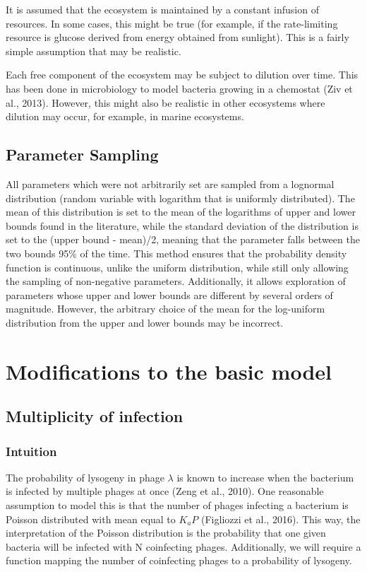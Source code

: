 \documentclass{article}
\begin{document}
It is assumed that the ecosystem is maintained by a constant infusion of resources. In some cases, this might be true (for example, if the rate-limiting resource is glucose derived from energy obtained from sunlight). This is a fairly simple assumption that may be realistic. 

Each free component of the ecosystem may be subject to dilution over time. This has been done in microbiology to model bacteria growing in a chemostat (Ziv et al., 2013). However, this might also be realistic in other ecosystems where dilution may occur, for example, in marine ecosystems. 

\subsection{Parameter Sampling}

All parameters which were not arbitrarily set are sampled from a lognormal distribution (random variable with logarithm that is uniformly distributed). The mean of this distribution is set to the mean of the logarithms of upper and lower bounds found in the literature, while the standard deviation of the distribution is set to the (upper bound - mean)/2, meaning that the parameter falls between the two bounds 95$\%$ of the time. This method ensures that the probability density function is continuous, unlike the uniform distribution, while still only allowing the sampling of non-negative parameters. Additionally, it allows exploration of parameters whose upper and lower bounds are different by several orders of magnitude. However, the arbitrary choice of the mean for the log-uniform distribution from the upper and lower bounds may be incorrect.

\section{Modifications to the basic model}
\subsection{Multiplicity of infection}
\subsubsection{Intuition}
The probability of lysogeny in phage $\lambda$ is known to increase when the bacterium is infected by multiple phages at once (Zeng et al., 2010). One reasonable assumption to model this is that the number of phages infecting a bacterium is Poisson distributed with mean equal to $K_aP$ (Figliozzi et al., 2016). This way, the interpretation of the Poisson distribution is the probability that one given bacteria will be infected with N coinfecting phages. Additionally, we will require a function mapping the number of coinfecting phages to a probability of lysogeny.
\end{document}
